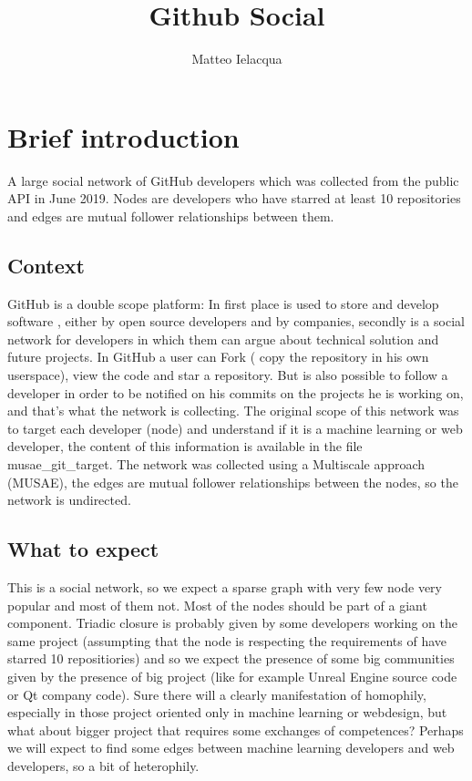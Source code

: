 \documentclass[]{article}
\begin{document}
\author{Matteo Ielacqua}
\title{Github Social}
\maketitle
    \section{Brief introduction}
    A large social network of GitHub developers which was collected from the public API in June 2019. Nodes are developers who have starred at least 10 repositories and edges are mutual follower relationships between them.
    \subsection{Context}
    GitHub is a double scope platform: In first place is used to store and develop software , either by open source developers and by companies, secondly is a social network for developers in which them can argue about technical solution and future projects. In GitHub a user can Fork ( copy the repository in his own userspace), view the code and star a repository. But is also possible to follow a developer in order to be notified on his commits on the projects he is working on, and that's what the network is collecting. The original scope of this network was to target each developer (node) and understand if it is a machine learning or web developer, the content of this information is available in the file musae\_git\_target. The network was collected using a Multiscale approach (MUSAE), the edges are mutual follower relationships between the nodes, so the network is undirected.
    
    \subsection{What to expect}
    This is a social network, so we expect a sparse graph with very few node very popular and most of them not. Most of the nodes should be part of a giant component. Triadic closure is probably given by some developers working on the same project (assumpting that the node is respecting the requirements of have starred 10 repositiories) and so we expect the presence of some big communities given by the presence of big project (like for example Unreal Engine source code or Qt company code). Sure there will a clearly manifestation of homophily, especially in those project oriented only in machine learning or webdesign, but what about bigger project that requires some exchanges of competences? Perhaps we will expect to find some edges between machine learning developers and web developers, so a bit of heterophily.
\end{document}
